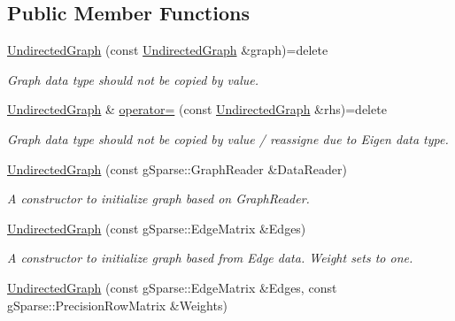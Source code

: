 \subsection*{Public Member Functions}
\begin{DoxyCompactItemize}
\item 
\mbox{\label{classg_sparse_1_1_undirected_graph_a2e8177317d83d7a468c4abd69dcf3bb1}} 
\mbox{\hyperlink{classg_sparse_1_1_undirected_graph_a2e8177317d83d7a468c4abd69dcf3bb1}{Undirected\+Graph}} (const \mbox{\hyperlink{classg_sparse_1_1_undirected_graph}{Undirected\+Graph}} \&graph)=delete
\begin{DoxyCompactList}\small\item\em Graph data type should not be copied by value. \end{DoxyCompactList}\item 
\mbox{\label{classg_sparse_1_1_undirected_graph_a1861d653adafc04d227819603de7e446}} 
\mbox{\hyperlink{classg_sparse_1_1_undirected_graph}{Undirected\+Graph}} \& \mbox{\hyperlink{classg_sparse_1_1_undirected_graph_a1861d653adafc04d227819603de7e446}{operator=}} (const \mbox{\hyperlink{classg_sparse_1_1_undirected_graph}{Undirected\+Graph}} \&rhs)=delete
\begin{DoxyCompactList}\small\item\em Graph data type should not be copied by value / reassigne due to Eigen data type. \end{DoxyCompactList}\item 
\mbox{\hyperlink{classg_sparse_1_1_undirected_graph_a3f87a642cb86f46a6a53434598cc1674}{Undirected\+Graph}} (const g\+Sparse\+::\+Graph\+Reader \&Data\+Reader)
\begin{DoxyCompactList}\small\item\em A constructor to initialize graph based on Graph\+Reader. \end{DoxyCompactList}\item 
\mbox{\hyperlink{classg_sparse_1_1_undirected_graph_ad9dcd1dd5a47a1f35ee019a007e3cc40}{Undirected\+Graph}} (const g\+Sparse\+::\+Edge\+Matrix \&Edges)
\begin{DoxyCompactList}\small\item\em A constructor to initialize graph based from Edge data. Weight sets to one. \end{DoxyCompactList}\item 
\mbox{\hyperlink{classg_sparse_1_1_undirected_graph_af9609f1e66af95a0bf201a1185394421}{Undirected\+Graph}} (const g\+Sparse\+::\+Edge\+Matrix \&Edges, const g\+Sparse\+::\+Precision\+Row\+Matrix \&Weights)

\end{DoxyCompactItemize}
